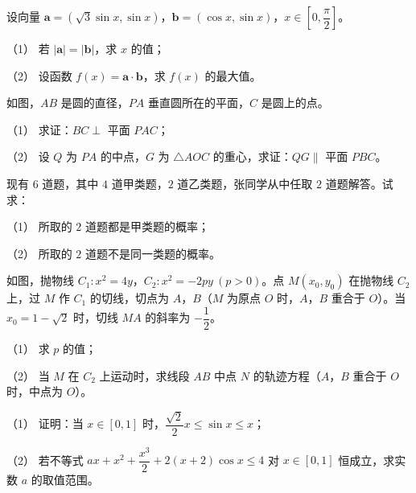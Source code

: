 \begin{question}
设向量 $\boldsymbol a=\left(\sqrt3\sin x,\sin x\right)$，$\boldsymbol b=\left(\cos x,\sin x\right)$，$x\in\left[0,\dfrac\pi2\right]$。

（1） 若 $|\boldsymbol a|=|\boldsymbol b|$，求 $x$ 的值；

（2） 设函数 $f(x)=\boldsymbol a\cdot\boldsymbol b$，求 $f(x)$ 的最大值。

\Needspace{0.4\textheight}
\end{question}
\begin{question}
如图，$AB$ 是圆的直径，$PA$ 垂直圆所在的平面，$C$ 是圆上的点。

（1） 求证：$BC\perp$ 平面 $PAC$；

（2） 设 $Q$ 为 $PA$ 的中点，$G$ 为 $\triangle AOC$ 的重心，求证：$QG\parallel$ 平面 $PBC$。
\nopagebreak[4]
\begin{center}\end{center}
\nopagebreak[4]
\end{question}
\begin{question}
现有 $6$ 道题，其中 $4$ 道甲类题，$2$ 道乙类题，张同学从中任取 $2$ 道题解答。试求：

（1） 所取的 $2$ 道题都是甲类题的概率；

（2） 所取的 $2$ 道题不是同一类题的概率。

\Needspace{0.4\textheight}
\end{question}
\begin{question}
如图，抛物线 $C_1:x^2=4y$，$C_2:x^2=-2py\ (p>0)$。点 $M(x_0,y_0)$ 在抛物线 $C_2$ 上，过 $M$ 作 $C_1$ 的切线，切点为 $A$，$B$（$M$ 为原点 $O$ 时，$A$，$B$ 重合于 $O$）。当 $x_0=1-\sqrt2$ 时，切线 $MA$ 的斜率为 $-\dfrac12$。

（1） 求 $p$ 的值；

（2） 当 $M$ 在 $C_2$ 上运动时，求线段 $AB$ 中点 $N$ 的轨迹方程（$A$，$B$ 重合于 $O$ 时，中点为 $O$）。
\nopagebreak[4]
\begin{center}\end{center}
\nopagebreak[4]
\end{question}
\begin{question}

（1） 证明：当 $x\in[0,1]$ 时，$\dfrac{\sqrt2}2x\leqslant\sin x\leqslant x$；

（2） 若不等式 $ax+x^2+\dfrac{x^3}2+2(x+2)\cos x\leqslant4$ 对 $x\in[0,1]$ 恒成立，求实数 $a$ 的取值范围。

\Needspace{0.4\textheight}
\end{question}
